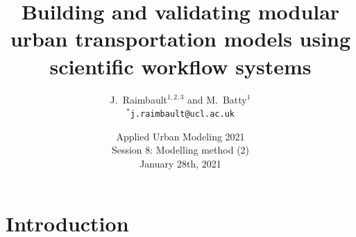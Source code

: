 



\title
[Modular urban transportation models]{Building and validating modular urban transportation models using scientific workflow systems}
\author[Raimbault]{J.~Raimbault$^{1,2,3}$ and M.~Batty$^{1}$\\\medskip
$^{\ast}$\texttt{j.raimbault@ucl.ac.uk}
}





\date[28/01/2021]{Applied Urban Modeling 2021\\
Session 8: Modelling method (2)\\
January 28th, 2021\\
}

\frame{\maketitle}



%  


\section{Introduction}




